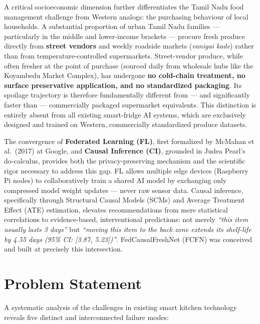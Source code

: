 \documentclass[12pt,a4paper]{report}
\begin{document}
A critical socioeconomic dimension further differentiates the Tamil Nadu food management challenge from Western analogs: the purchasing behaviour of local households. A substantial proportion of urban Tamil Nadu families — particularly in the middle and lower-income brackets — procure fresh produce directly from \textbf{street vendors} and weekly roadside markets (\textit{vanigai kade}) rather than from temperature-controlled supermarkets. Street-vendor produce, while often fresher at the point of purchase (sourced daily from wholesale hubs like the Koyambedu Market Complex), has undergone \textbf{no cold-chain treatment, no surface preservative application, and no standardized packaging}. Its spoilage trajectory is therefore fundamentally different from — and significantly faster than — commercially packaged supermarket equivalents. This distinction is entirely absent from all existing smart-fridge AI systems, which are exclusively designed and trained on Western, commercially standardized produce datasets.

The convergence of \textbf{Federated Learning (FL)}, first formalized by McMahan et al.\ (2017) at Google, and \textbf{Causal Inference (CI)}, grounded in Judea Pearl's do-calculus, provides both the privacy-preserving mechanism and the scientific rigor necessary to address this gap. FL allows multiple edge devices (Raspberry Pi nodes) to collaboratively train a shared AI model by exchanging only compressed model weight updates — never raw sensor data. Causal inference, specifically through Structural Causal Models (SCMs) and Average Treatment Effect (ATE) estimation, elevates recommendations from mere statistical correlations to evidence-based, interventional predictions: not merely \textit{``this item usually lasts 3 days''} but \textit{``moving this item to the back zone extends its shelf-life by 4.55 days (95\% CI: [3.87, 5.23])''}. FedCausalFreshNet (FCFN) was conceived and built at precisely this intersection.

\section{Problem Statement}

A systematic analysis of the challenges in existing smart kitchen technology reveals five distinct and interconnected failure modes:
\end{document}
